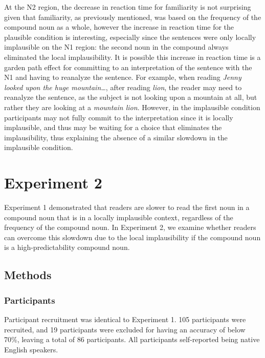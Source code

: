 \documentclass[
  12pt,
  letterpaper,
]{scrreport}
\begin{document}
At the N2 region, the decrease in reaction time for familiarity is not
surprising given that familiarity, as previously mentioned, was based on
the frequency of the compound noun as a whole, however the increase in
reaction time for the plausible condition is interesting, especially
since the sentences were only locally implausible on the N1 region: the
second noun in the compound always eliminated the local implausibility.
It is possible this increase in reaction time is a garden path effect
for committing to an interpretation of the sentence with the N1 and
having to reanalyze the sentence. For example, when reading \emph{Jenny
looked upon the huge mountain\ldots{}}, after reading \emph{lion}, the
reader may need to reanalyze the sentence, as the subject is not looking
upon a mountain at all, but rather they are looking at a \emph{mountain
lion}. However, in the implausible condition participants may not fully
commit to the interpretation since it is locally implausible, and thus
may be waiting for a choice that eliminates the implausibility, thus
explaining the absence of a similar slowdown in the implausible
condition.

\section{Experiment 2}\label{experiment-2}

Experiment 1 demonstrated that readers are slower to read the first noun
in a compound noun that is in a locally implausible context, regardless
of the frequency of the compound noun. In Experiment 2, we examine
whether readers can overcome this slowdown due to the local
implausibility if the compound noun is a high-predictability compound
noun.

\subsection{Methods}\label{methods-1}

\subsubsection{Participants}\label{participants-1}

Participant recruitment was identical to Experiment 1. 105 participants
were recruited, and 19 participants were excluded for having an accuracy
of below 70\%, leaving a total of 86 participants. All participants
self-reported being native English speakers.
\end{document}
